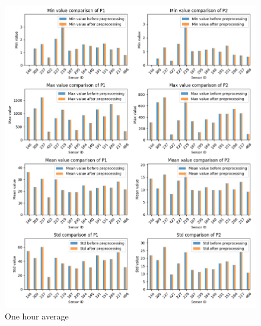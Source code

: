 \documentclass[12pt,a4paper,twoside]{scrartcl}
\numberwithin{equation}{section}
\newcounter{mypagecount}%
\newenvironment{interlude}{%
  \clearpage
  \setcounter{mypagecount}{\value{page}}%
  \thispagestyle{empty}%
  \pagestyle{empty}%
  }{%
  \clearpage
  \setcounter{page}{\value{mypagecount}}%
  }
\begin{document}
\begin{interlude}
\begin{appendices}
\begin{center}
      \begin{figure}[H]
        \centerline{\includegraphics[width=1.1\textwidth,height=1.3\textwidth]{figures/1H_sensor_metrics}}
        \caption[Metrics change during preprocessing (one hour average)]{One hour average}
      \end{figure}
      
    \end{center}
    

  \end{appendices}
  
  
  
  
\end{interlude}
\end{document}
